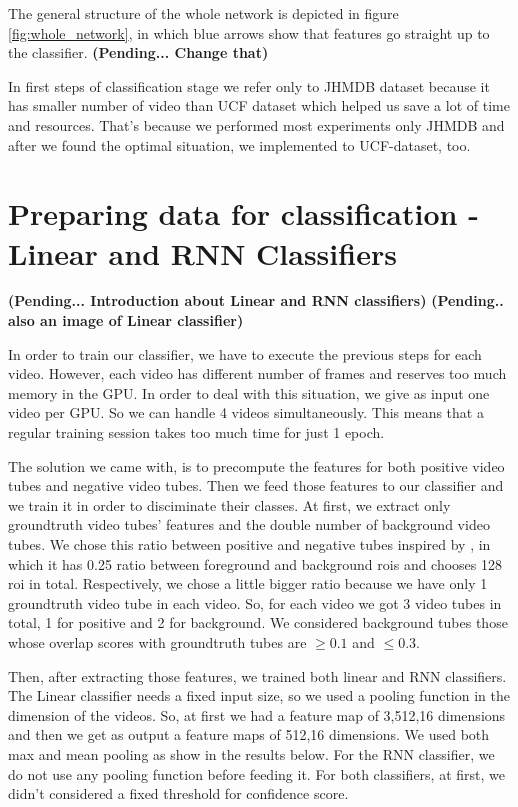The general structure of the whole network is depicted in figure \ref{fig:whole_network}, in which blue arrows show that
features go straight up to the classifier. \textbf{(Pending... Change that)} \par
In first steps of classification stage we refer only to JHMDB dataset because it has smaller number of video than UCF dataset which
helped us save a lot of time and resources. That's because  we performed most experiments only JHMDB and after we found the optimal
situation, we implemented to UCF-dataset, too. 

\section{Preparing data for classification - Linear and RNN Classifiers}

\textbf{(Pending... Introduction about Linear and RNN classifiers)}
\textbf{(Pending.. also an image of Linear classifier)}

In order to train our classifier, we have to execute the previous steps for each video. However, each video
has different number of frames and reserves too much memory in the GPU. In order to deal with this situation,
we give as input one video per GPU. So we can handle 4 videos simultaneously. This means that a regular
training session takes too much time for just 1 epoch. \par
The solution we came with, is to precompute the features for both positive video tubes and negative video tubes.
Then we feed those features to our classifier and we train it in order to disciminate their classes.
At first, we extract only groundtruth video tubes' features and the double number of background video tubes. We chose this
ratio between positive and negative tubes inspired by \cite{jjfaster2rcnn}, in which it has 0.25 ratio between foreground
and background rois and chooses 128 roi in total. Respectively, we chose a little bigger ratio because we have only 1 groundtruth
video tube in each video. So, for each video we got 3 video tubes in total, 1 for positive and 2 for background. We considered
background tubes those whose overlap scores with groundtruth tubes are $ \ge 0.1 $ and $ \le 0.3 $. \par

Then, after extracting those features, we trained both linear and RNN classifiers. The Linear classifier needs a fixed input size,
so we used a pooling function in the dimension of the videos. So, at first we had a feature map of 3,512,16 dimensions and then we
get as output a feature maps of 512,16 dimensions. We used both max and mean pooling as show in the results below. For the RNN
classifier, we do not use any pooling function before feeding it. For both classifiers, at first, we didn't considered a fixed
threshold for confidence score.

